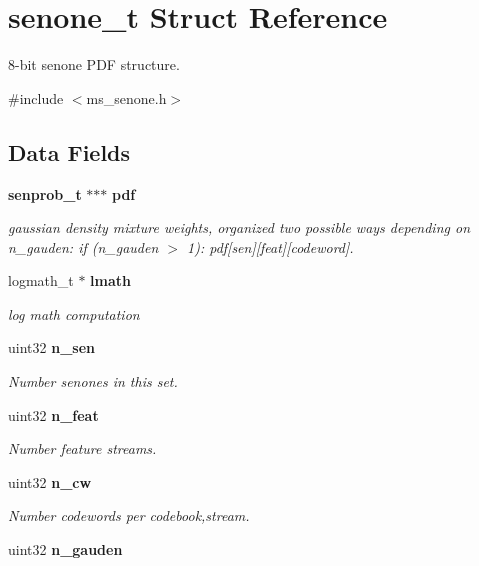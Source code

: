 \section{senone\-\_\-t Struct Reference}
\label{structsenone__t}


8-\/bit senone P\-D\-F structure.  




{\ttfamily \#include $<$ms\-\_\-senone.\-h$>$}

\subsection*{Data Fields}
\begin{DoxyCompactItemize}
\item 
{\bf senprob\-\_\-t} $\ast$$\ast$$\ast$ {\bf pdf}
\begin{DoxyCompactList}\small\item\em gaussian density mixture weights, organized two possible ways depending on n\-\_\-gauden\-: if (n\-\_\-gauden $>$ 1)\-: pdf[sen][feat][codeword]. \end{DoxyCompactList}\item 
logmath\-\_\-t $\ast$ {\bf lmath}\label{structsenone__t_aa8621fab8c5b7a13493cae5549a5e0de}

\begin{DoxyCompactList}\small\item\em log math computation \end{DoxyCompactList}\item 
uint32 {\bf n\-\_\-sen}\label{structsenone__t_a769aa6d2fc16b33c0b9a1cbf31592422}

\begin{DoxyCompactList}\small\item\em Number senones in this set. \end{DoxyCompactList}\item 
uint32 {\bf n\-\_\-feat}\label{structsenone__t_a6a0aa50b8ff66e06f7305d1c8e4a17be}

\begin{DoxyCompactList}\small\item\em Number feature streams. \end{DoxyCompactList}\item 
uint32 {\bf n\-\_\-cw}\label{structsenone__t_a3c382a37dc9cb650d910bb881c52b336}

\begin{DoxyCompactList}\small\item\em Number codewords per codebook,stream. \end{DoxyCompactList}\item 
uint32 {\bf n\-\_\-gauden}\label{structsenone__t_a71cf7b41b2334216944380296c03c99a}


\end{DoxyCompactItemize}
